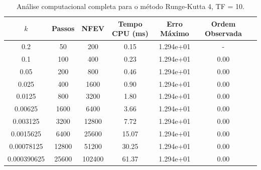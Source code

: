 \begin{table}[H]
    \centering
    \begin{tabular}{ccccccc}
        \hline
        $k$ & Passos & NFEV & Tempo CPU (ms) & Erro Máximo & Ordem Observada \\
        \hline
        0.2 & 50 & 200 & 0.15  & 1.294e+01 & - \\
        0.1 & 100 & 400 & 0.23  & 1.294e+01 & 0.00 \\
        0.05 & 200 & 800 & 0.46  & 1.294e+01 & 0.00 \\
        0.025 & 400 & 1600 & 0.90  & 1.294e+01 & 0.00 \\
        0.0125 & 800 & 3200 & 1.80  & 1.294e+01 & 0.00 \\
        0.00625 & 1600 & 6400 & 3.66  & 1.294e+01 & 0.00 \\
        0.003125 & 3200 & 12800 & 7.72  & 1.294e+01 & 0.00 \\
        0.0015625 & 6400 & 25600 & 15.07  & 1.294e+01 & 0.00 \\
        0.00078125 & 12800 & 51200 & 30.25  & 1.294e+01 & 0.00 \\
        0.000390625 & 25600 & 102400 & 61.37  & 1.294e+01 & 0.00 \\
        \hline
    \end{tabular}
    \caption{Análise computacional completa para o método Runge-Kutta 4, TF = 10.}
    \label{tab:erros_runge-kutta_4,_tf_=_10}
\end{table}

